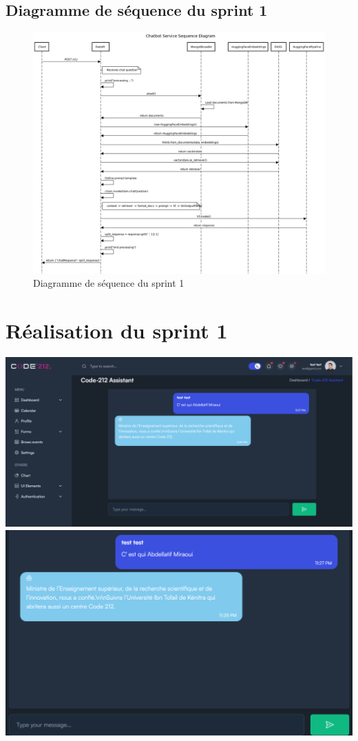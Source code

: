\documentclass[a4paper, 11pt, openany]{report}
\begin{document}
\subsection{Diagramme de séquence du sprint 1}
\begin{figure}[H]
\centering
\includegraphics[width=1.2\textwidth]{chatbot-seq.png}
\caption{Diagramme de séquence du sprint 1}
\label{fig:sprint1_seq}
\end{figure}
\FloatBarrier
\section{Réalisation du sprint 1}

\begin{center}
    \includegraphics[width=1\textwidth]{chat1.png}
    \includegraphics[width=1\textwidth]{chat2.png}
\end{center}
\end{document}
